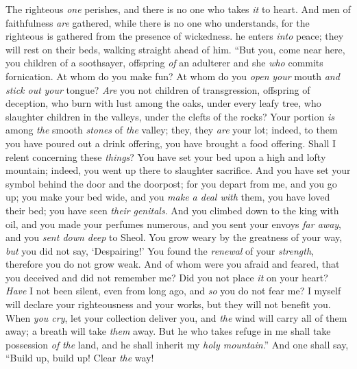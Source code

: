 \begin{biblechapter} %
 The righteous \textit{one} perishes, and there is no one who takes \textit{it} to heart. 
And men of faithfulness \textit{are} gathered, while there is no one who understands, 
for the righteous is gathered from the presence of wickedness.
\verse he enters \textit{into} peace; 
they will rest on their beds, 
walking straight ahead of him.
\verse “But you, come near here, you children of a soothsayer, 
offspring \textit{of} an adulterer and she \textit{who} commits fornication.
\verse At whom do you make fun? 
At whom do you \textit{open} \textit{your} mouth \textit{and} \textit{stick out} \textit{your} tongue? 
\textit{Are} you not children of transgression, 
offspring of deception,
\verse who burn with lust among the oaks, 
under every leafy tree, 
who slaughter children in the valleys, 
under the clefts of the rocks?
\verse Your portion \textit{is} among \textit{the} smooth \textit{stones} of \textit{the} valley; 
they, they \textit{are} your lot; 
indeed, to them you have poured out a drink offering, 
you have brought a food offering. Shall I relent concerning these \textit{things}?
\verse You have set your bed upon a high and lofty mountain; 
indeed, you went up there to slaughter sacrifice.
\verse And you have set your symbol behind the door and the doorpost; 
for you depart from me, and you go up; 
you make your bed wide, and you \textit{make a deal with} them, 
you have loved their bed; you have seen \textit{their} \textit{genitals}.
\verse And you climbed down to the king with oil, 
and you made your perfumes numerous, 
and you sent your envoys \textit{far away}, 
and you \textit{sent down deep} to Sheol.
\verse You grow weary by the greatness of your way, 
\textit{but} you did not say, ‘Despairing!’ 
You found the \textit{renewal} of your \textit{strength}, 
therefore you do not grow weak.
\verse And of whom were you afraid and feared, that you deceived 
and did not remember me? 
Did you not place \textit{it} on your heart? 
\textit{Have} I not been silent, even from long ago, 
and \textit{so} you do not fear me?
\verse I myself will declare your righteousness and your works, 
but they will not benefit you.
\verse When \textit{you cry}, let your collection deliver you, 
and \textit{the} wind will carry all of them away; 
a breath will take \textit{them} away. 
But he who takes refuge in me shall take possession \textit{of} \textit{the} land, 
and he shall inherit my \textit{holy mountain}.”
 And one shall say, “Build up, build up! Clear \textit{the} way! 

\end{biblechapter}
